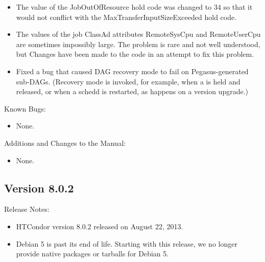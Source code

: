 \begin{itemize}
\item The value of the JobOutOfResource hold code was changed to 34 so that
it would not conflict with the MaxTransferInputSizeExceeded hold code.

\item The values of the job ClassAd attributes RemoteSysCpu and RemoteUserCpu
are sometimes impossibly large. The problem is rare and not well understood,
but Changes have been made to the code in an attempt to fix this problem.

\item Fixed a bug that caused DAG recovery mode to fail on
Pegasus-generated sub-DAGs.  (Recovery mode is invoked, for example,
when a  is held and released, or when a schedd is
restarted, as happens on a version upgrade.)

\end{itemize}

\noindent Known Bugs:

\begin{itemize}

\item None.

\end{itemize}

\noindent Additions and Changes to the Manual:

\begin{itemize}

\item None.

\end{itemize}


\subsection*{\label{sec:New-8-0-2}Version 8.0.2}

\noindent Release Notes:

\begin{itemize}

\item HTCondor version 8.0.2 released on August 22, 2013.

\item Debian 5 is past its end of life. 
Starting with this release, we no longer provide native packages or
tarballs for Debian 5.

\end{itemize}


